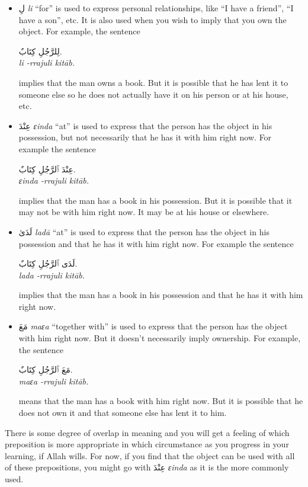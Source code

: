 \documentclass[
  10pt,
]{book}
\begin{document}
\begin{itemize}
\item
  \foreignlanguage{arabic}{لِ} \emph{li} \enquote{for} is used to express personal relationships, like \enquote{I have a friend}, \enquote{I have a son}, etc. It is also used when you wish to imply that you own the object. For example, the sentence

  \foreignlanguage{arabic}{لِلرَّجُلِ کِتَابٌ.}\\
  \emph{li -rrajuli kitāb.}

  implies that the man owns a book. But it is possible that he has lent it to someone else so he does not actually have it on his person or at his house, etc.
\item
  \foreignlanguage{arabic}{عِنْدَ} \emph{ɛinda} \enquote{at} is used to express that the person has the object in his possession, but not necessarily that he has it with him right now. For example the sentence

  \foreignlanguage{arabic}{عِنْدَ ٱلرَّجُلِ کِتَابٌ.}\\
  \emph{ɛinda -rrajuli kitāb.}

  implies that the man has a book in his possession. But it is possible that it may not be with him right now. It may be at his house or elsewhere.
\item
  \foreignlanguage{arabic}{لَدَىٰ} \emph{ladā} \enquote{at} is used to express that the person has the object in his possession and that he has it with him right now. For example the sentence

  \foreignlanguage{arabic}{لَدَى ٱلرَّجُلِ کِتَابٌ.}\\
  \emph{lada -rrajuli kitāb.}

  implies that the man has a book in his possession and that he has it with him right now.
\item
  \foreignlanguage{arabic}{مَعَ} \emph{maɛa} \enquote{together with} is used to express that the person has the object with him right now. But it doesn't necessarily imply ownership. For example, the sentence

  \foreignlanguage{arabic}{مَعَ ٱلرَّجُلِ کِتَابٌ.}\\
  \emph{maɛa -rrajuli kitāb.}

  means that the man has a book with him right now. But it is possible that he does not own it and that someone else has lent it to him.
\end{itemize}

There is some degree of overlap in meaning and you will get a feeling of which preposition is more appropriate in which circumstance as you progress in your learning, if Allah wills. For now, if you find that the object can be used with all of these prepositions, you might go with \foreignlanguage{arabic}{عِنْدَ} \emph{ɛinda} as it is the more commonly used.
\end{document}
